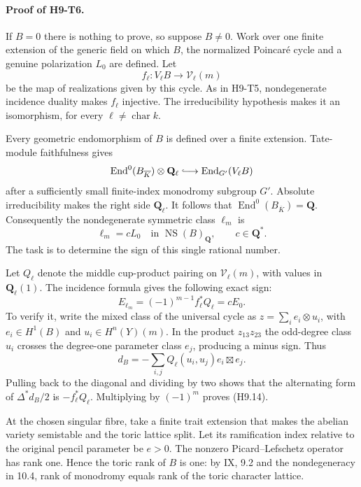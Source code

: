 \documentclass[11pt,a4paper]{article}
\begin{document}
\paragraph{Proof of H9-T6.}
If $B=0$ there is nothing to prove, so suppose $B\ne0$. Work over one
finite extension of the generic field on which $B$, the normalized
Poincar\'e cycle and a genuine polarization $L_0$ are defined. Let
\[
 f_\ell:V_\ell B\longrightarrow\mathcal V_\ell(m)
\]
be the map of realizations given by this cycle. As in H9-T5,
nondegenerate incidence duality makes $f_\ell$ injective. The
irreducibility hypothesis makes it an isomorphism, for every
$\ell\ne\operatorname{char}k$.

Every geometric endomorphism of $B$ is defined over a finite extension.
Tate-module faithfulness gives
\[
 \operatorname{End}^0(B_{\overline K})\otimes\mathbf Q_\ell
   \lhook\joinrel\longrightarrow
 \operatorname{End}_{G'}(V_\ell B)
\]
after a sufficiently small finite-index monodromy subgroup $G'$.
Absolute irreducibility makes the right side $\mathbf Q_\ell$.
It follows that $\operatorname{End}^0(B_{\overline K})=\mathbf Q$.
Consequently the nondegenerate symmetric class $\ell_m$ is
\[
 \ell_m=c L_0\quad\text{in }\operatorname{NS}(B)_{\mathbf Q},
 \qquad c\in\mathbf Q^* .                              \tag{H9.13}
\]
The task is to determine the sign of this single rational number.

Let $Q_\ell$ denote the middle cup-product pairing on
$\mathcal V_\ell(m)$, with values in $\mathbf Q_\ell(1)$.
The incidence formula gives the following exact sign:
\[
 E_{\ell_m}=(-1)^{m-1}f_\ell^*Q_\ell=cE_0.            \tag{H9.14}
\]
To verify it, write the mixed class of the universal cycle as
$z=\sum_i e_i\otimes u_i$, with $e_i\in H^1(B)$ and
$u_i\in H^n(Y)(m)$. In the product $z_{13}z_{23}$ the odd-degree
class $u_i$ crosses the degree-one parameter class $e_j$, producing
a minus sign. Thus
\[
 d_B=-\sum_{i,j}Q_\ell(u_i,u_j)e_i\boxtimes e_j.
\]
Pulling back to the diagonal and dividing by two shows that the
alternating form of $\Delta^*d_B/2$ is $-f_\ell^*Q_\ell$.
Multiplying by $(-1)^m$ proves (H9.14).

At the chosen singular fibre, take a finite trait extension that makes
the abelian variety semistable and the toric lattice split. Let its
ramification index relative to the original pencil parameter be $e>0$.
The nonzero Picard--Lefschetz operator has rank one. Hence the toric rank
of $B$ is one: by IX, 9.2 and the nondegeneracy in 10.4, rank of monodromy
equals rank of the toric character lattice.
\end{document}
